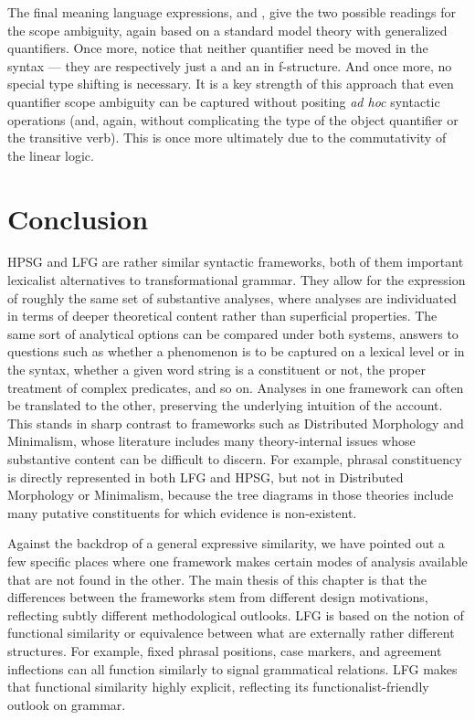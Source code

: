 %
\begin{sloppypar}\noindent 
  The final meaning language expressions,
   and
  , give
  the two possible readings for the scope ambiguity, again based on a
  standard model theory with generalized quantifiers. Once more,
  notice that neither quantifier need be moved in the syntax --- they
  are respectively just a  and an  in
  f-structure. And once more, no special type shifting is necessary. It
  is a key strength of this approach that even quantifier scope
  ambiguity can be captured without positing \emph{ad hoc} syntactic
  operations (and, again, without complicating the type of the object
  quantifier or the transitive verb). This is once more ultimately due to the
  commutativity of the linear logic.
\end{sloppypar}


\section{Conclusion}

HPSG and LFG  are rather similar syntactic frameworks, both of them important lexicalist alternatives to transformational grammar.  They allow for the expression of roughly the same set of substantive analyses, where analyses are individuated in terms of deeper theoretical content rather than superficial properties.  The same sort of analytical options can be compared under both systems, answers to questions such as whether a phenomenon is to be captured on a lexical level or in the syntax, whether a given word string is a constituent or not, the proper treatment of complex predicates, and so on.   Analyses in one framework can often be translated to the other, preserving the underlying intuition of the account.   This stands in sharp contrast to frameworks such as Distributed Morphology and Minimalism, whose literature includes many theory-internal issues whose substantive content can be difficult to discern.  For example, phrasal constituency is directly represented in both LFG and HPSG, but not in Distributed Morphology or Minimalism, because the tree diagrams in those theories include many putative constituents for which evidence is non-existent.  

Against the backdrop of a general expressive similarity, we have pointed out a few specific places where one framework makes certain modes of analysis available that are not found in the other.   The main thesis of this chapter is that the differences between the frameworks stem from different design motivations, reflecting subtly different methodological outlooks.  LFG is based on the notion of functional similarity or equivalence between what are externally rather different structures.   For example, fixed phrasal positions, case markers, and agreement inflections can all function similarly to signal grammatical relations.  LFG makes that functional similarity highly explicit, reflecting its functionalist-friendly outlook on grammar.  
 
